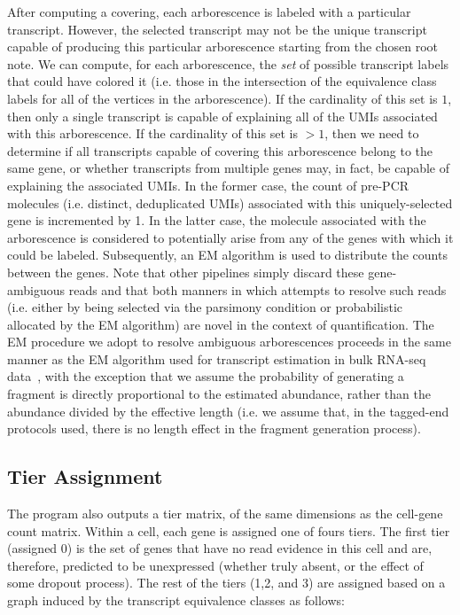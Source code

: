 After computing a covering, each arborescence is labeled with a particular transcript.  However, the selected transcript may not be the unique transcript capable of producing this particular arborescence starting from the chosen root note.  We can compute, for each arborescence, the \emph{set} of possible transcript labels that could have colored it (i.e. those in the intersection of the equivalence class labels for all of the vertices in the arborescence).  If the cardinality of this set is $1$, then only a single transcript is capable of explaining all of the UMIs associated with this arborescence.  If the cardinality of this set is $>1$, then we need to determine if all transcripts capable of covering this arborescence belong to the same gene, or whether transcripts from multiple genes may, in fact, be capable of explaining the associated UMIs. In the former case, the count of pre-PCR molecules (i.e. distinct, deduplicated UMIs) associated with this uniquely-selected gene is incremented by 1. In the latter case, the molecule associated with the arborescence is considered to potentially arise from any of the genes with which it could be labeled. Subsequently, an EM algorithm is used to distribute the counts between the genes. Note that other pipelines simply discard these gene-ambiguous reads and that both manners in which \alevin attempts to resolve such reads (i.e. either by being selected via the parsimony condition or probabilistic allocated by the EM algorithm) are novel in the context of \scrnaseq quantification. The EM procedure we adopt to resolve ambiguous arborescences proceeds in the same manner as the EM algorithm used for transcript estimation in bulk RNA-seq data~\cite{salmon}, with the exception that we assume the probability of generating a fragment is directly proportional to the estimated abundance, rather than the abundance divided by the effective length (i.e. we assume that, in the tagged-end protocols used, there is no length effect in the fragment generation process).

\subsection{Tier Assignment}
\label{sec:tier_algo}
The \alevin program also outputs a tier matrix, of the same dimensions as the cell-gene count matrix. Within a cell, each gene is assigned one of fours tiers. The first tier (assigned 0) is the set of genes that have no read evidence in this cell and are, therefore, predicted to be unexpressed (whether truly absent, or the effect of some dropout process). The rest of the tiers (1,2, and 3) are assigned based on a graph induced by the transcript equivalence classes as follows:

